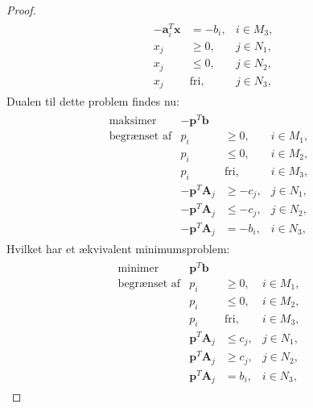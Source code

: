 \begin{proof}
\begin{align*}
\begin{array}{lrll}
					&-\textbf{a}_i^T\textbf{x}	& = -b_i,	&i \in M_3,\\
					&x_j					&\geq 0,	&j \in N_1,\\
					&x_j					&\leq 0,	&j \in N_2,\\							&x_j					&\text{fri},	&j \in N_3,
\end{array}
\end{align*}
Dualen til dette problem findes nu:
\begin{align*}
\begin{array}{lrll}
\text{maksimer}		&-\textbf{p}^T\textbf{b}	&			&\\
\text{begrænset af}	&p_i					&\geq 0,	&i \in M_1,\\
					&p_i					&\leq 0,	&i \in M_2,\\
					&p_i					&\text{fri},	&i \in M_3,\\
					&-\textbf{p}^T\textbf{A}_j	&\geq -c_j,	&j \in N_1,\\
					&-\textbf{p}^T\textbf{A}_j	&\leq -c_j,	&j \in N_2,\\
					&-\textbf{p}^T\textbf{A}_j	& = -b_i,	&i \in N_3,
\end{array}
\end{align*}
Hvilket har et ækvivalent minimumsproblem:
\begin{align*}
\begin{array}{lrll}
\text{minimer}		&\textbf{p}^T\textbf{b}	&			&\\
\text{begrænset af}	&p_i					&\geq 0,	&i \in M_1,\\
					&p_i					&\leq 0,	&i \in M_2,\\
					&p_i					&\text{fri},	&i \in M_3,\\
					&\textbf{p}^T\textbf{A}_j	&\leq c_j,	&j \in N_1,\\
					&\textbf{p}^T\textbf{A}_j	&\geq c_j,	&j \in N_2,\\
					&\textbf{p}^T\textbf{A}_j	& = b_i,	&i \in N_3,
\end{array}
\end{align*}
\end{proof}




